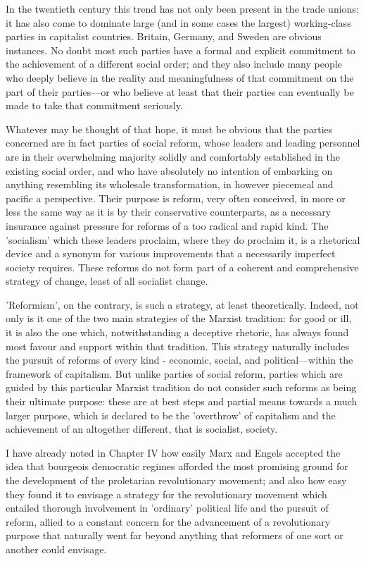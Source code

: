 In the twentieth century this trend has not only been present in the trade unions: it has also come to dominate large (and in some cases the largest) working-class parties in capitalist countries. Britain, Germany, and Sweden are obvious instances. No doubt most such parties have a formal and explicit commitment to the achievement of a different social order; and they also include many people who deeply believe in the reality and meaningfulness of that commitment on the part of their parties—or who believe at least that their parties can eventually be made to take that commitment seriously.

Whatever may be thought of that hope, it must be obvious that the parties concerned are in fact parties of social reform, whose leaders and leading personnel are in their overwhelming majority solidly and comfortably established in the existing social order, and who have absolutely no intention of embarking on anything resembling its wholesale transformation, in however piecemeal and pacific a perspective. Their purpose is reform, very often conceived, in more or less the same way as it is by their conservative counterparts, as a necessary insurance against pressure for reforms of a too radical and rapid kind. The 'socialism' which these leaders proclaim, where they do proclaim it, is a rhetorical device and a synonym for various improvements that a necessarily imperfect society requires. These reforms do not form part of a coherent and comprehensive strategy of change, least of all socialist change.

'Reformism', on the contrary, is such a strategy, at least theoretically. Indeed, not only is it one of the two main strategies of the Marxist tradition: for good or ill, it is also the one which, notwithstanding a deceptive rhetoric, has always found most favour and support within that tradition. This strategy naturally includes the pursuit of reforms of every kind - economic, social, and political—within the framework of capitalism. But unlike parties of social reform, parties which are guided by this particular Marxist tradition do not consider such reforms as being their ultimate purpose: these are at best steps and partial means towards a much larger purpose, which is declared to be the 'overthrow' of capitalism and the achievement of an altogether different, that is socialist, society.

I have already noted in Chapter IV how easily Marx and Engels accepted the idea that bourgeois democratic regimes afforded the most promising ground for the development of the proletarian revolutionary movement; and also how easy they found it to envisage a strategy for the revolutionary movement which entailed thorough involvement in 'ordinary' political life and the pursuit of reform, allied to a constant concern for the advancement of a revolutionary purpose that naturally went far beyond anything that reformers of one sort or another could envisage.

